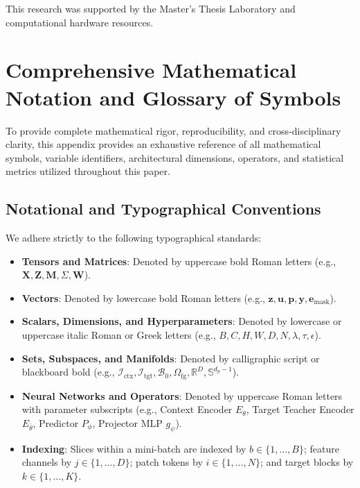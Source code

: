 \documentclass{article}
\begin{document}
\begin{ack}
This research was supported by the Master's Thesis Laboratory and computational hardware resources.
\end{ack}





\newpage
\appendix

\section{Comprehensive Mathematical Notation and Glossary of Symbols}
\label{sec:appendix_math_notation}

To provide complete mathematical rigor, reproducibility, and cross-disciplinary clarity, this appendix provides an exhaustive reference of all mathematical symbols, variable identifiers, architectural dimensions, operators, and statistical metrics utilized throughout this paper.

\subsection{Notational and Typographical Conventions}
We adhere strictly to the following typographical standards:
\begin{itemize}
    \item \textbf{Tensors and Matrices}: Denoted by uppercase bold Roman letters (e.g., $\mathbf{X}, \mathbf{Z}, \mathbf{M}, \Sigma, \mathbf{W}$).
    \item \textbf{Vectors}: Denoted by lowercase bold Roman letters (e.g., $\mathbf{z}, \mathbf{u}, \mathbf{p}, \mathbf{y}, \mathbf{e}_{\text{mask}}$).
    \item \textbf{Scalars, Dimensions, and Hyperparameters}: Denoted by lowercase or uppercase italic Roman or Greek letters (e.g., $B, C, H, W, D, N, \lambda, \tau, \epsilon$).
    \item \textbf{Sets, Subspaces, and Manifolds}: Denoted by calligraphic script or blackboard bold (e.g., $\mathcal{I}_{\text{ctx}}, \mathcal{I}_{\text{tgt}}, \mathcal{B}_0, \Omega_{\text{fg}}, \mathbb{R}^D, \mathbb{S}^{d_p - 1}$).
    \item \textbf{Neural Networks and Operators}: Denoted by uppercase Roman letters with parameter subscripts (e.g., Context Encoder $E_\theta$, Target Teacher Encoder $E_{\bar{\theta}}$, Predictor $P_\phi$, Projector MLP $g_\psi$).
    \item \textbf{Indexing}: Slices within a mini-batch are indexed by $b \in \{1, \dots, B\}$; feature channels by $j \in \{1, \dots, D\}$; patch tokens by $i \in \{1, \dots, N\}$; and target blocks by $k \in \{1, \dots, K\}$.
\end{itemize}
\end{document}
